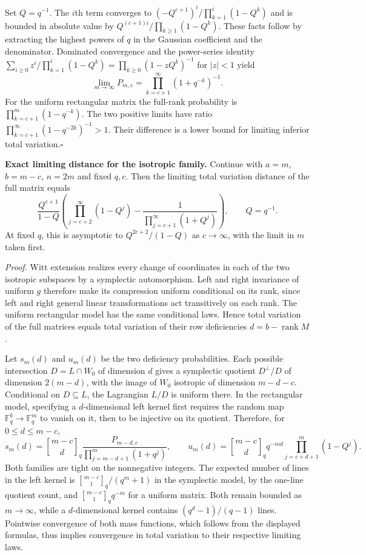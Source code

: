 Set $Q=q^{-1}$. The $i$th term converges to $(-Q^{c+1})^i/\prod_{k=1}^i(1-Q^k)$ and is bounded in absolute value by $Q^{(c+1)i}/\prod_{k\ge1}(1-Q^k)$. These facts follow by extracting the highest powers of $q$ in the Gaussian coefficient and the denominator. Dominated convergence and the power-series identity
$\sum_{i\ge0}z^i/\prod_{k=1}^i(1-Q^k)=\prod_{k\ge0}(1-zQ^k)^{-1}$
for $|z|<1$ yield
\[
 \lim_{m\to\infty}P_{m,c}=\prod_{k=c+1}^\infty(1+q^{-k})^{-1}.
\]
For the uniform rectangular matrix the full-rank probability is $\prod_{k=c+1}^{m}(1-q^{-k})$. The two positive limits have ratio $\prod_{k=c+1}^\infty(1-q^{-2k})^{-1}>1$. Their difference is a lower bound for limiting inferior total variation.\hfill$\square$

\medskip\noindent\textbf{Exact limiting distance for the isotropic family.}
Continue with $a=m$, $b=m-c$, $n=2m$ and fixed $q,c$. Then the limiting total variation distance of the full matrix equals
\[
 \frac{Q^{c+1}}{1-Q}
 \left(\prod_{j=c+2}^{\infty}(1-Q^j)
       -\frac{1}{\prod_{j=c+1}^{\infty}(1+Q^j)}\right),
 \qquad Q=q^{-1}.
\]
At fixed $q$, this is asymptotic to $Q^{2c+2}/(1-Q)$ as $c\to\infty$, with the limit in $m$ taken first.

\emph{Proof.}
Witt extension realizes every change of coordinates in each of the two isotropic subspaces by a symplectic automorphism. Left and right invariance of uniform $g$ therefore make its compression uniform conditional on its rank, since left and right general linear transformations act transitively on each rank. The uniform rectangular model has the same conditional laws. Hence total variation of the full matrices equals total variation of their row deficiencies $d=b-\operatorname{rank}M$.

Let $s_m(d)$ and $u_m(d)$ be the two deficiency probabilities. Each possible intersection $D=L\cap W_0$ of dimension $d$ gives a symplectic quotient $D^\perp/D$ of dimension $2(m-d)$, with the image of $W_0$ isotropic of dimension $m-d-c$. Conditional on $D\subseteq L$, the Lagrangian $L/D$ is uniform there. In the rectangular model, specifying a $d$-dimensional left kernel first requires the random map $\mathbb F_q^b\to\mathbb F_q^m$ to vanish on it, then to be injective on its quotient. Therefore, for $0\le d\le m-c$,
\[
 s_m(d)=\genfrac{[}{]}{0pt}{}{m-c}{d}_{q}\frac{P_{m-d,c}}{\prod_{j=m-d+1}^{m}(1+q^j)},\qquad
 u_m(d)=\genfrac{[}{]}{0pt}{}{m-c}{d}_{q} q^{-md}\prod_{j=c+d+1}^{m}(1-Q^j).
\]
Both families are tight on the nonnegative integers. The expected number of lines in the left kernel is \( \genfrac{[}{]}{0pt}{}{m-c}{1}_{q}/(q^m+1)\) in the symplectic model, by the one-line quotient count, and \( \genfrac{[}{]}{0pt}{}{m-c}{1}_{q} q^{-m}\) for a uniform matrix. Both remain bounded as $m\to\infty$, while a $d$-dimensional kernel contains $(q^d-1)/(q-1)$ lines. Pointwise convergence of both mass functions, which follows from the displayed formulas, thus implies convergence in total variation to their respective limiting laws.

